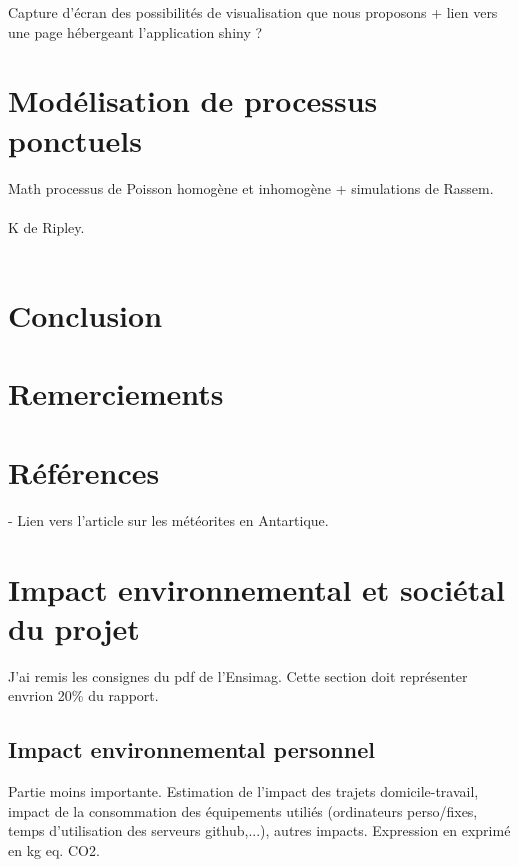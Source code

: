 \documentclass[12pt]{article}
\begin{document}
Capture d'écran des possibilités de visualisation que nous proposons + lien vers une page hébergeant l'application shiny ?

\section{Modélisation de processus ponctuels}
Math processus de Poisson homogène et inhomogène + simulations de Rassem.\\
\\
K de Ripley.\\
\\
\section{Conclusion}
\section{Remerciements}
\section{Références}
\printbibliography
- Lien vers l'article sur les météorites en Antartique.
\section{Impact environnemental et sociétal du projet}
J'ai remis les consignes du pdf de l'Ensimag. Cette section doit représenter envrion 20\% du rapport.
\subsection{Impact environnemental personnel}
Partie moins importante.
Estimation de l'impact des trajets domicile-travail, impact de la consommation des équipements utiliés (ordinateurs perso/fixes, temps d'utilisation des serveurs github,...), autres impacts.
Expression en exprimé en kg eq. CO2.
\end{document}

